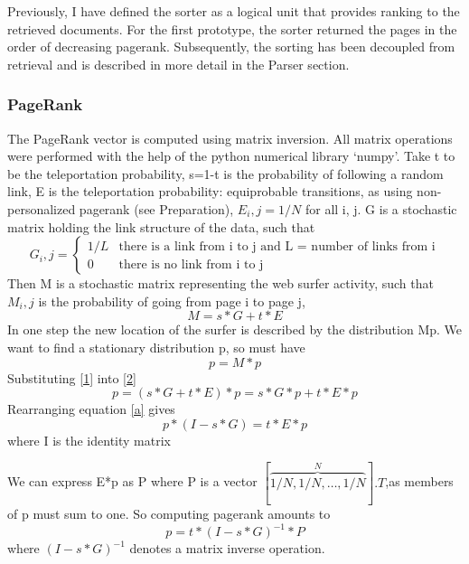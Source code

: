 \documentclass[12pt,twoside,notitlepage]{report}
\begin{document}
Previously, I have defined the sorter as a logical unit that provides ranking to the
retrieved documents. For the first prototype, the sorter returned the pages in
the order of decreasing pagerank.
Subsequently, the sorting has been decoupled from retrieval and is described in
more detail in the Parser section.

\subsubsection*{PageRank} 
The PageRank vector is computed using matrix inversion. All matrix operations
were performed with the help of the python numerical library `numpy'.  Take t
to be the teleportation probability, s=1-t is the probability of following a
random link, E is the teleportation probability: equiprobable transitions, as
using non-personalized pagerank (see Preparation), \(E_i,j = 1/N\) for all i,
j. G is a stochastic matrix holding the link structure of the data, such that 
\begin{equation*}
  G_i,j = \begin{cases}
    1/L & \text{there is a link from i to j and L = number of links from i}\\
    0   & \text{there is no link from i to j}
  \end{cases}
\end{equation*}
Then M is a stochastic matrix representing the web surfer activity, such
that \(M_i,j\) is the probability of going from page i to page j, 
\begin{equation} \label{1}
  M = s*G +t*E
\end{equation}
In one step the new location of the surfer is described by the distribution Mp.
We want to find a stationary distribution p, so must have
\begin{equation}\label{2}
  p = M*p
\end{equation}
Substituting \ref{1} into \ref{2}
\begin{equation} \label{a}
  p = (s*G+t*E)*p = s*G*p + t*E*p
\end{equation}
Rearranging equation \ref{a} gives
\begin{equation}
  p*(I-s*G) = t*E*p
\end{equation}
where I is the identity matrix

We can express E*p as P where P is a vector
\([\overbrace{1/N,1/N,\dots,1/N}^N].T\),as members of p must sum to one.
So computing pagerank amounts to
\begin{equation}
p  = t*(I-s*G)^{-1}*P
\end{equation}
where \((I-s*G)^{-1}\) denotes a matrix inverse operation.
\end{document}
